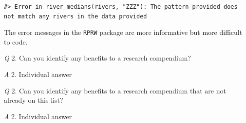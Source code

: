 \documentclass[
]{book}
\begin{document}
\begin{verbatim}
#> Error in river_medians(rivers, "ZZZ"): The pattern provided does not match any rivers in the data provided
\end{verbatim}

The error messages in the \texttt{RPRW} package are more informative but more difficult to code.

\emph{Q} 2. Can you identify any benefits to a research compendium?

\emph{A} 2. Individual answer

\emph{Q} 2. Can you identify any benefits to a research compendium that are not already on this list?

\emph{A} 2. Individual answer

  
\end{document}
